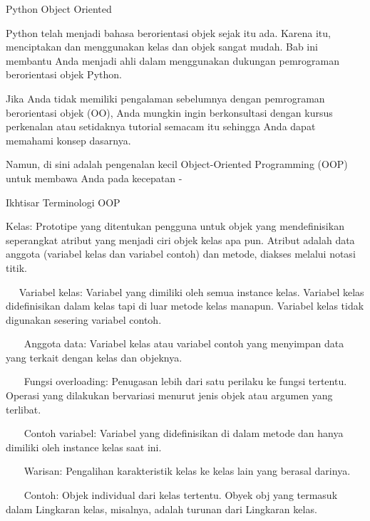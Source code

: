 
Python Object Oriented \par
Python telah menjadi bahasa berorientasi objek sejak itu ada. Karena itu, menciptakan dan menggunakan kelas dan objek sangat mudah. Bab ini membantu Anda menjadi ahli dalam menggunakan dukungan pemrograman berorientasi objek Python. \par
\vspace{12pt}
Jika Anda tidak memiliki pengalaman sebelumnya dengan pemrograman berorientasi objek (OO), Anda mungkin ingin berkonsultasi dengan kursus perkenalan atau setidaknya tutorial semacam itu sehingga Anda dapat memahami konsep dasarnya. \par
\vspace{12pt}
Namun, di sini adalah pengenalan kecil Object-Oriented Programming (OOP) untuk membawa Anda pada kecepatan - \par
Ikhtisar Terminologi OOP \par
\vspace{12pt}
Kelas: Prototipe yang ditentukan pengguna untuk objek yang mendefinisikan seperangkat atribut yang menjadi ciri objek kelas apa pun. Atribut adalah data anggota (variabel kelas dan variabel contoh) dan metode, diakses melalui notasi titik. \par
\vspace{12pt}
~~ Variabel kelas: Variabel yang dimiliki oleh semua instance kelas. Variabel kelas didefinisikan dalam kelas tapi di luar metode kelas manapun. Variabel kelas tidak digunakan sesering variabel contoh. \par
\vspace{12pt}
~~~ Anggota data: Variabel kelas atau variabel contoh yang menyimpan data yang terkait dengan kelas dan objeknya. \par
\vspace{12pt}
~~~ Fungsi overloading: Penugasan lebih dari satu perilaku ke fungsi tertentu. Operasi yang dilakukan bervariasi menurut jenis objek atau argumen yang terlibat. \par
\vspace{12pt}
~~~ Contoh variabel: Variabel yang didefinisikan di dalam metode dan hanya dimiliki oleh instance kelas saat ini. \par
\vspace{12pt}
~~~ Warisan: Pengalihan karakteristik kelas ke kelas lain yang berasal darinya. \par
\vspace{12pt}
~~~ Contoh: Objek individual dari kelas tertentu. Obyek obj yang termasuk dalam Lingkaran kelas, misalnya, adalah turunan dari Lingkaran kelas. \par
